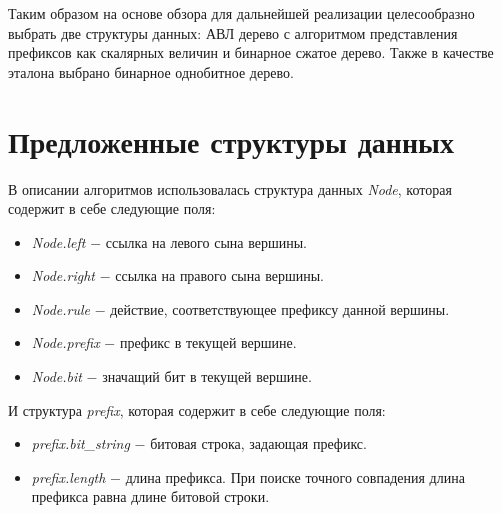 \documentclass[9pt,a4paper]{article}
\begin{document}
        Таким образом на основе обзора для дальнейшей реализации целесообразно выбрать две структуры данных: 
        АВЛ дерево с алгоритмом представления префиксов как скалярных величин и бинарное сжатое дерево. 
        Также в качестве эталона выбрано бинарное однобитное дерево.

\section{Предложенные структуры данных}
        \label{section:trees}
        В описании алгоритмов использовалась структура данных \emph{Node}, которая содержит в себе следующие поля:
        \begin{itemize}
            \item \emph{Node.left} $-$ ссылка на левого сына вершины.
            \item \emph{Node.right} $-$ ссылка на правого сына вершины.
            \item \emph{Node.rule} $-$ действие, соответствующее префиксу данной вершины.
            \item \emph{Node.prefix} $-$ префикс в текущей вершине.
            \item \emph{Node.bit} $-$ значащий бит в текущей вершине.
        \end{itemize}
        И структура \emph{prefix}, которая содержит в себе следующие поля:
        \begin{itemize}
            \item \emph{prefix.bit\_string} $-$ битовая строка, задающая префикс.
            \item \emph{prefix.length} $-$ длина префикса. При поиске точного совпадения длина префикса равна длине битовой строки.
        \end{itemize}
\end{document}
